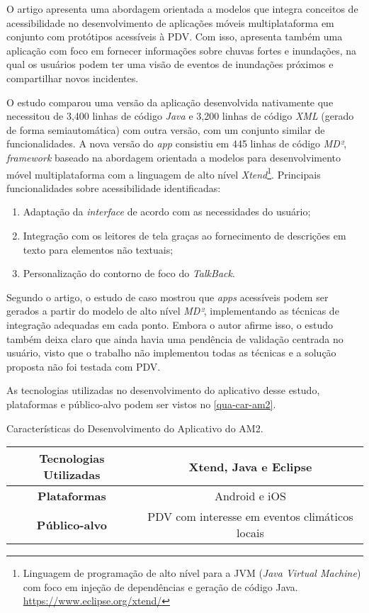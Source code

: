 O artigo apresenta uma abordagem orientada a modelos que integra conceitos de acessibilidade no desenvolvimento de aplicações móveis multiplataforma em conjunto com protótipos
acessíveis à PDV\@. Com isso, apresenta também uma aplicação com foco em fornecer informações sobre chuvas fortes e inundações, na qual
os usuários podem ter uma visão de eventos de inundações próximos e compartilhar novos incidentes.

O estudo comparou uma versão da aplicação desenvolvida nativamente que necessitou de 3,400 linhas de código \emph{Java} e 3,200 linhas de código \emph{XML}
(gerado de forma semiautomática) com outra versão, com um conjunto similar de funcionalidades. A nova versão do \emph{app} consistiu em 445 linhas de código \emph{MD²}, \emph{framework}
baseado na abordagem orientada a modelos para desenvolvimento móvel multiplataforma com a linguagem de alto nível \emph{Xtend}\footnote{
  Linguagem de programação de alto nível para a JVM (\emph{Java Virtual Machine}) com foco em injeção de dependências e geração de código Java. \url{https://www.eclipse.org/xtend/}}.
Principais funcionalidades sobre acessibilidade identificadas:

\begin{enumerate}
  \item Adaptação da \emph{interface} de acordo com as necessidades do usuário;
  \item Integração com os leitores de tela graças ao fornecimento de descrições em texto para elementos não textuais;
  \item Personalização do contorno de foco do \emph{TalkBack}.
\end{enumerate}

Segundo o artigo, o estudo de caso mostrou que \emph{apps} acessíveis podem ser gerados a partir do modelo de alto nível \emph{MD²}, implementando as técnicas de integração adequadas em
cada ponto. Embora o autor afirme isso, o estudo também deixa claro que ainda havia uma pendência de validação centrada no usuário, visto que o trabalho não implementou todas as técnicas
e a solução proposta não foi testada com PDV\@.

As tecnologias utilizadas no desenvolvimento do aplicativo desse estudo, plataformas e público-alvo podem ser vistos
no \autoref{qua-car-am2}.

\begin{quadro}[htb!]
  \caption{\label{qua-car-am2}Características do Desenvolvimento do Aplicativo do AM2.}
  \begin{tabular}{|c|c|}
    \hline
    \textbf{Tecnologias Utilizadas} & Xtend, Java e Eclipse                          \\ \hline
    \textbf{Plataformas}            & Android e iOS                                  \\ \hline
    \textbf{Público-alvo}           & PDV com interesse em eventos climáticos locais \\
    \hline
  \end{tabular}
\end{quadro}

